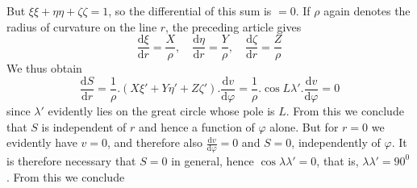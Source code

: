 But \(\xi\xi+\eta\eta+\zeta\zeta=1\), so the differential of this sum is \(=0\). If \(\rho\) again denotes the radius of curvature on the line \(r\), the preceding article gives
\[
\frac{\mathrm{d}\xi}{\mathrm{d}r}=\frac{X}{\rho},\quad\frac{\mathrm{d}\eta}{\mathrm{d}r}=\frac{Y}{\rho},\quad\frac{\mathrm{d}\zeta}{\mathrm{d}r}=\frac{Z}{\rho}
\]
We thus obtain
\[
\frac{\mathrm{d}S}{\mathrm{d}r}=\frac{1}{\rho}\mathord{.}(X\xi'+Y\eta'+Z\zeta')\mathord{.}\frac{\mathrm{d}v}{\mathrm{d}\varphi}=\frac{1}{\rho}\mathord{.}\cos L\lambda'\mathord{.}\frac{\mathrm{d}v}{\mathrm{d}\varphi}=0
\]
since \(\lambda'\) evidently lies on the great circle whose pole is \(L\). From this we conclude that \(S\) is independent of \(r\) and hence a function of \(\varphi\) alone. But for \(r=0\) we evidently have \(v=0\), and therefore also \(\frac{\mathrm{d}v}{\mathrm{d}\varphi}=0\) and \(S=0\), independently of \(\varphi\). It is therefore necessary that \(S=0\) in general, hence \(\cos\lambda\lambda'=0\), that is, \(\lambda\lambda'=90^0\). From this we conclude
